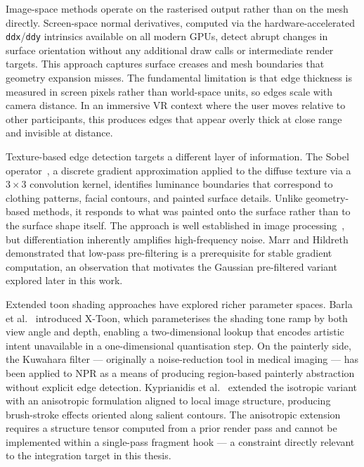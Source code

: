 Image-space methods operate on the rasterised output rather than on the mesh directly. Screen-space normal derivatives, computed via the hardware-accelerated \texttt{ddx}/\texttt{ddy} intrinsics available on all modern GPUs, detect abrupt changes in surface orientation without any additional draw calls or intermediate render targets. This approach captures surface creases and mesh boundaries that geometry expansion misses. The fundamental limitation is that edge thickness is measured in screen pixels rather than world-space units, so edges scale with camera distance. In an immersive VR context where the user moves relative to other participants, this produces edges that appear overly thick at close range and invisible at distance.

Texture-based edge detection targets a different layer of information. The Sobel operator~\cite{gonzalez2018}, a discrete gradient approximation applied to the diffuse texture via a $3\times3$ convolution kernel, identifies luminance boundaries that correspond to clothing patterns, facial contours, and painted surface details. Unlike geometry-based methods, it responds to what was painted onto the surface rather than to the surface shape itself. The approach is well established in image processing~\cite{canny1986}, but differentiation inherently amplifies high-frequency noise. Marr and Hildreth~\cite{marr1980} demonstrated that low-pass pre-filtering is a prerequisite for stable gradient computation, an observation that motivates the Gaussian pre-filtered variant explored later in this work.

Extended toon shading approaches have explored richer parameter spaces. Barla et al.~\cite{barla2006} introduced X-Toon, which parameterises the shading tone ramp by both view angle and depth, enabling a two-dimensional lookup that encodes artistic intent unavailable in a one-dimensional quantisation step. On the painterly side, the Kuwahara filter — originally a noise-reduction tool in medical imaging — has been applied to NPR as a means of producing region-based painterly abstraction without explicit edge detection. Kyprianidis et al.~\cite{kyprianidis2009} extended the isotropic variant with an anisotropic formulation aligned to local image structure, producing brush-stroke effects oriented along salient contours. The anisotropic extension requires a structure tensor computed from a prior render pass and cannot be implemented within a single-pass fragment hook — a constraint directly relevant to the integration target in this thesis.

